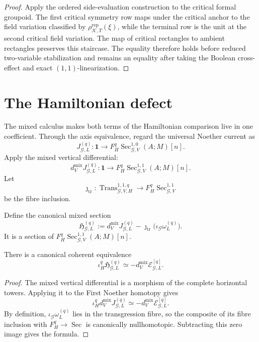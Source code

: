 \begin{proof}
Apply the ordered side-evaluation construction to the critical formal groupoid.
The first critical symmetry row maps under the critical anchor to the field
variation classified by $\rho_{\mathcal K,T}^{\mathrm{rep}}(\xi)$, while the
terminal row is the unit at the second critical field variation.  The map of
critical rectangles to ambient rectangles preserves this staircase.  The equality
therefore holds before reduced two-variable stabilization and remains an equality
after taking the Boolean cross-effect and exact $(1,1)$-linearization.
\end{proof}


\section{The Hamiltonian defect}
\label{sec:symmetry-noether-the-hamiltonian-defect}

The mixed calculus makes both terms of the Hamiltonian comparison live in
one coefficient.  Through the axis equivalence, regard the universal Noether
current as
\[
J_{\mathcal G,L}^{(q)}
:
\mathbf1
\longrightarrow
F_H^q\operatorname{Sec}_{\mathcal G,V}^{1,0}(A;M)[n].
\]
Apply the mixed vertical differential:
\[
d_V^{\mathrm{mix}}J_{\mathcal G,L}^{(q)}
:
\mathbf1
\longrightarrow
F_H^q\operatorname{Sec}_{\mathcal G,V}^{1,1}(A;M)[n].
\]
Let
\[
\jmath_{\mathrm{tr}}:
\operatorname{Trans}_{\mathcal G,V,H}^{1,1,q}
\longrightarrow
F_H^q\operatorname{Sec}_{\mathcal G,V}^{1,1}
\]
be the fibre inclusion.

\begin{definition}
\label{def:symmetry-noether-hamiltonian-defect}
Define the canonical mixed section
\[
\boxed{
\mathfrak H_{\mathcal G,L}^{(q)}
:=
d_V^{\mathrm{mix}}J_{\mathcal G,L}^{(q)}
-
\jmath_{\mathrm{tr}}
\bigl(\iota_{\mathcal G}\omega_L^{(q)}\bigr).
}
\]
It is a section of
$F_H^q\operatorname{Sec}_{\mathcal G,V}^{1,1}(A;M)[n]$.
\end{definition}

\begin{proposition}
\label{prop:symmetry-noether-horizontal-image-of-the-hamiltonian-defect}
There is a canonical coherent equivalence
\[
\boxed{
\iota_H^q
\mathfrak H_{\mathcal G,L}^{(q)}
\simeq
-
d_V^{\mathrm{mix}}\mathscr E_{\mathcal G,L}^{[q]}.
}
\]
\end{proposition}

\begin{proof}
The mixed vertical differential is a morphism of the complete horizontal
towers.  Applying it to the First Noether homotopy gives
\[
\iota_H^q d_V^{\mathrm{mix}}J_{\mathcal G,L}^{(q)}
\simeq
-d_V^{\mathrm{mix}}\mathscr E_{\mathcal G,L}^{[q]}.
\]
By definition,
$\iota_{\mathcal G}\omega_L^{(q)}$ lies in the transgression fibre, so the
composite of its fibre inclusion with
$F_H^q\to\operatorname{Sec}$ is canonically nullhomotopic.  Subtracting this
zero image gives the formula.
\end{proof}


